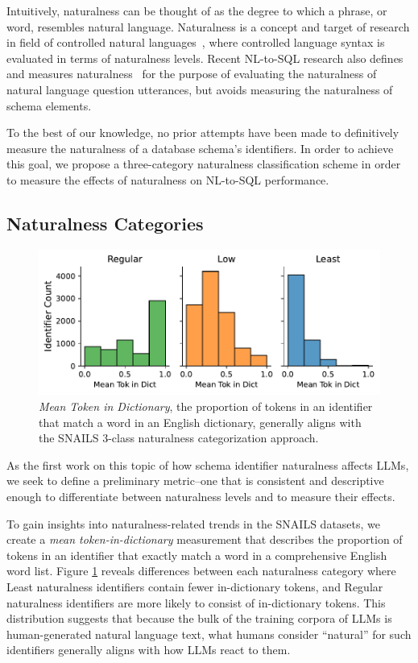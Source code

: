 Intuitively, naturalness can be thought of as the degree to which a phrase, or word, resembles natural language. 
Naturalness is a concept and target of research in field of controlled natural languages~\cite{10.1162/COLI_a_00168}, where controlled language syntax is evaluated in terms of naturalness levels. 
Recent NL-to-SQL research also defines and measures naturalness~\cite{10.14778/3494124.3494139} for the purpose of evaluating the naturalness of natural language question utterances, but avoids measuring the naturalness of schema elements.

To the best of our knowledge, no prior attempts have been made to definitively measure the naturalness of a database schema's identifiers.
In order to achieve this goal, we propose a three-category naturalness classification scheme in order to measure the effects of naturalness on NL-to-SQL performance.

\subsection{Naturalness Categories}
\label{section:naturalness-categories}

\begin{figure}
  \centering
  \includegraphics[width=\figwidthmod\linewidth]{figures/mean_token_in_dictionary.pdf}
  \caption{\emph{Mean Token in Dictionary}, the proportion of tokens in an identifier that match a word in an English dictionary, generally aligns with the SNAILS 3-class naturalness categorization approach.}
  \label{fig:meantokenindictionary}
\end{figure}

As the first work on this topic of how schema identifier naturalness affects LLMs, we seek to define a preliminary metric--one that is consistent and descriptive enough to differentiate between naturalness levels and to measure their effects.

To gain insights into naturalness-related trends in the SNAILS datasets, we create a \emph{mean token-in-dictionary} measurement that describes the proportion of tokens in an identifier that exactly match a word in a comprehensive English word list.
Figure \ref{fig:meantokenindictionary} reveals differences between each naturalness category where Least naturalness identifiers contain fewer in-dictionary tokens, and Regular naturalness identifiers are more likely to consist of in-dictionary tokens.
This distribution suggests that because the bulk of the training corpora of LLMs is human-generated natural language text, what humans consider ``natural'' for such identifiers generally aligns with how LLMs react to them.

